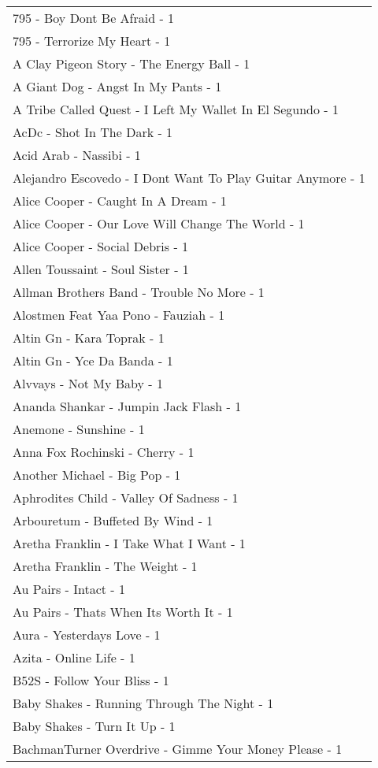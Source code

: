 \documentclass[
]{article}
\begin{document}
\begin{longtable}{l}
795 - Boy Dont Be Afraid - 1 \\ 
795 - Terrorize My Heart - 1 \\ 
A Clay Pigeon Story - The Energy Ball - 1 \\ 
A Giant Dog - Angst In My Pants - 1 \\ 
A Tribe Called Quest - I Left My Wallet In El Segundo - 1 \\ 
AcDc - Shot In The Dark - 1 \\ 
Acid Arab - Nassibi - 1 \\ 
Alejandro Escovedo - I Dont Want To Play Guitar Anymore - 1 \\ 
Alice Cooper - Caught In A Dream - 1 \\ 
Alice Cooper - Our Love Will Change The World - 1 \\ 
Alice Cooper - Social Debris - 1 \\ 
Allen Toussaint - Soul Sister - 1 \\ 
Allman Brothers Band - Trouble No More - 1 \\ 
Alostmen Feat Yaa Pono - Fauziah - 1 \\ 
Altin Gn - Kara Toprak - 1 \\ 
Altin Gn - Yce Da Banda - 1 \\ 
Alvvays - Not My Baby - 1 \\ 
Ananda Shankar - Jumpin Jack Flash - 1 \\ 
Anemone - Sunshine - 1 \\ 
Anna Fox Rochinski - Cherry - 1 \\ 
Another Michael - Big Pop - 1 \\ 
Aphrodites Child - Valley Of Sadness - 1 \\ 
Arbouretum - Buffeted By Wind - 1 \\ 
Aretha Franklin - I Take What I Want - 1 \\ 
Aretha Franklin - The Weight - 1 \\ 
Au Pairs - Intact - 1 \\ 
Au Pairs - Thats When Its Worth It - 1 \\ 
Aura - Yesterdays Love - 1 \\ 
Azita - Online Life - 1 \\ 
B52S - Follow Your Bliss - 1 \\ 
Baby Shakes - Running Through The Night - 1 \\ 
Baby Shakes - Turn It Up - 1 \\ 
BachmanTurner Overdrive - Gimme Your Money Please - 1 \\ 

\end{longtable}
\end{document}
